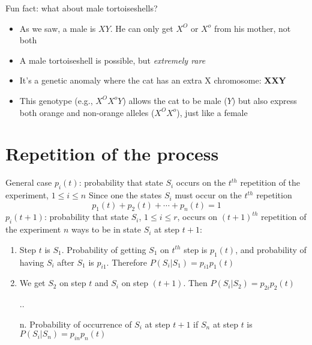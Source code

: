 \documentclass[aspectratio=169]{beamer}\usepackage[]{graphicx}\usepackage[]{xcolor}
\begin{document}
\begin{frame}{Fun fact: what about male tortoiseshells?}
    
    \begin{itemize}
        \item As we saw, a male is $XY$. He can only get $X^O$ or $X^o$ from his mother, not both
        \vfill
        
        \item A male tortoiseshell is possible, but \emph{extremely rare}
        
        \vfill
        
        \item It's a genetic anomaly where the cat has an extra X chromosome: \textbf{XXY}
        
        \vfill
        
        \item This genotype (e.g., $X^O X^o Y$) allows the cat to be male ($Y$) but also express both orange and non-orange alleles ($X^O X^o$), just like a female
    \end{itemize}
    
\end{frame}





\section{Repetition of the process}

\begin{frame}{General case}
$p_i(t)$: probability that state $S_i$ occurs on the $t^{th}$ repetition of the experiment, $1\leq i\leq n$
\vfill
Since one the states $S_i$ must occur on the $t^{th}$ repetition
\[
p_1(t)+p_2(t)+\cdots+p_n(t)=1
\]
$p_i(t+1)$: probability that state $S_i$, $1\leq i\leq r$, occurs on $(t+1)^{th}$ repetition of the experiment
\vfill
$n$ ways to be in state $S_i$ at step $t+1$:
\begin{enumerate}
\item Step $t$ is $S_1$. Probability of getting $S_1$ on $t^{th}$ step is $p_1(t)$, and probability of having $S_i$ after $S_1$ is $p_{i1}$. Therefore $P(S_i|S_1)=p_{i1}p_1(t)$
\item We get $S_2$ on step $t$ and $S_i$ on step $(t+1)$. Then $P(S_i|S_2)=p_{2i}p_2(t)$
\item[..]
\item[n.] Probability of occurrence of $S_i$ at step $t+1$ if $S_n$ at step $t$ is $P(S_i|S_n)=p_{in}p_n(t)$
\end{enumerate}
\end{frame}
\end{document}
